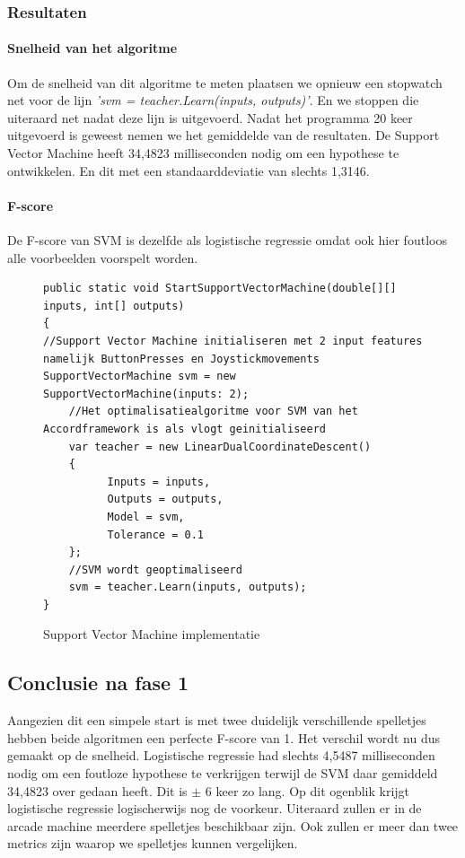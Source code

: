 \subsubsection{Resultaten}
\paragraph{Snelheid van het algoritme} 
Om de snelheid van dit algoritme te meten plaatsen we opnieuw een stopwatch net voor de lijn \textit{'svm = teacher.Learn(inputs, outputs)'}. En we stoppen die uiteraard net nadat deze lijn is uitgevoerd. Nadat het programma 20 keer uitgevoerd is geweest nemen we het gemiddelde van de resultaten. De Support Vector Machine heeft 34,4823 milliseconden nodig om een hypothese te ontwikkelen. En dit met een standaarddeviatie van slechts 1,3146.

\paragraph{F-score}
De F-score van SVM is dezelfde als logistische regressie omdat ook hier foutloos alle voorbeelden voorspelt worden.


\begin{figure}[]
\renewcommand{\figurename}{Code}
\begin{lstlisting}
public static void StartSupportVectorMachine(double[][] inputs, int[] outputs)
{
//Support Vector Machine initialiseren met 2 input features namelijk ButtonPresses en Joystickmovements
SupportVectorMachine svm = new 			SupportVectorMachine(inputs: 2);
	//Het optimalisatiealgoritme voor SVM van het Accordframework is als vlogt geinitialiseerd
	var teacher = new LinearDualCoordinateDescent()
	{
	      Inputs = inputs,
	      Outputs = outputs,
	      Model = svm,
	      Tolerance = 0.1
	};
	//SVM wordt geoptimaliseerd
	svm = teacher.Learn(inputs, outputs);
}
\end{lstlisting}
\caption{Support Vector Machine implementatie}
\label{code:svmBi}
\end{figure}
\subsection{Conclusie na fase 1}
Aangezien dit een simpele start is met twee duidelijk verschillende spelletjes hebben beide algoritmen een perfecte F-score van 1.  Het verschil wordt nu dus gemaakt op de snelheid. Logistische regressie had slechts 4,5487 milliseconden nodig om een foutloze hypothese te verkrijgen terwijl de SVM daar gemiddeld 34,4823 over gedaan heeft. Dit is $\pm$ 6 keer zo lang. 
\newline
Op dit ogenblik krijgt logistische regressie logischerwijs nog de voorkeur. Uiteraard zullen er in de arcade machine meerdere spelletjes beschikbaar zijn. Ook zullen er meer dan twee metrics zijn waarop we spelletjes kunnen vergelijken. 








